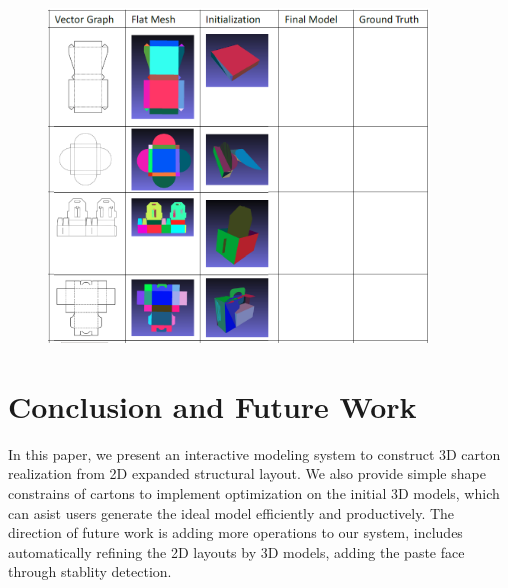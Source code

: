 \documentclass[submission]{gmp2018}
\begin{document}
\begin{figure}
	\centering
	\includegraphics[width=0.9\textwidth]{images/more.png}
	\caption{}
	\label{fig:more}
\end{figure}


\section{Conclusion and Future Work}\label{sec:conclusion}
In this paper, we present an interactive modeling system to construct 3D carton realization from 2D expanded structural layout. We also provide simple shape constrains of cartons to implement optimization on the initial 3D models, which can asist users generate the ideal model efficiently and productively. The direction of future work is adding more operations to our system, includes automatically refining the 2D layouts by 3D models, adding the paste face through stablity detection. 


\end{document}
